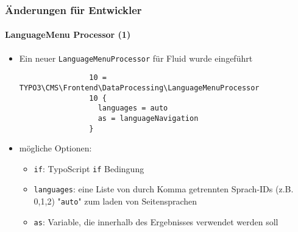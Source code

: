 \begin{frame}[fragile]
	\frametitle{Änderungen für Entwickler}
	\framesubtitle{LanguageMenu Processor (1)}

	\lstset{basicstyle=\tiny\ttfamily}

	\begin{itemize}
		\item Ein neuer \texttt{LanguageMenuProcessor} für Fluid wurde eingeführt

			\begin{lstlisting}
				10 = TYPO3\CMS\Frontend\DataProcessing\LanguageMenuProcessor
				10 {
				  languages = auto
				  as = languageNavigation
				}
			\end{lstlisting}

		\item mögliche Optionen:

			\begin{itemize}

				\item \texttt{if}: TypoScript \texttt{if} Bedingung
				\item \texttt{languages}: eine Liste von durch Komma getrennten Sprach-IDs
					(z.B. 0,1,2) "\texttt{auto}" zum laden von Seitensprachen
				\item \texttt{as}: Variable, die innerhalb des Ergebnisses verwendet werden soll
			\end{itemize}

	\end{itemize}

\end{frame}


